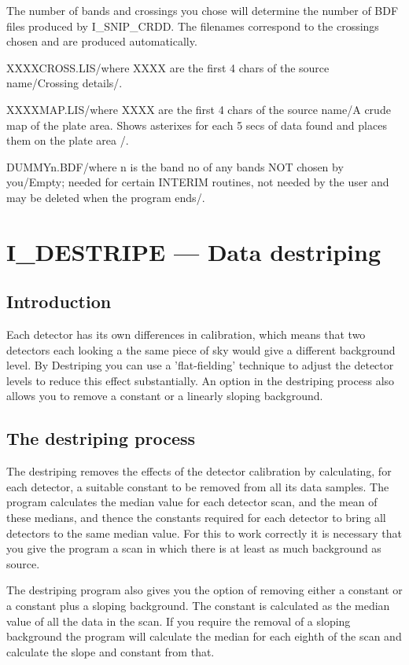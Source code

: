 The number of bands and crossings you chose will determine the number of BDF
files  produced by I\_SNIP\_CRDD. The filenames correspond to the crossings
chosen and are produced automatically.

\tfile XXXXCROSS.LIS/where XXXX are the first 4 chars of the
source name/Crossing details/.

\tfile XXXXMAP.LIS/where XXXX are the first 4 chars of the source name/A crude
map of the plate area.\hfill\break
Shows asterixes for each 5 secs of data found and places them on the plate
area\hfill\break
/.

\tfile DUMMYn.BDF/where n is the band no of any bands NOT chosen by you/Empty;
needed for certain INTERIM routines, not needed by the user and may be
deleted when the program ends/.


\pagebreak
\section {I\_DESTRIPE --- Data destriping}

\subsection {Introduction}

Each detector has its own differences in calibration, which means that two
detectors each looking a the same piece of sky would give a different background
level. By Destriping you can use a 'flat-fielding' technique  to adjust the
detector levels to reduce this effect substantially. An option in the
destriping process also allows you to remove a constant or a linearly sloping
background.

\subsection {The destriping process}

The destriping removes the effects of the detector calibration by calculating,
for each detector, a suitable constant to be removed from all its data samples.
The program calculates the median value for each detector scan, and the mean of
these medians, and thence the constants required for each detector to bring all
detectors to the same median value. For this to work correctly it is necessary
that you give the program a scan in which there is at least as much background
as source.

The destriping program also gives you the option of removing either a constant
or a constant plus a sloping background. The constant is calculated as the
median value of all the data in the scan. If you require the removal of a
sloping background the program will calculate the median for each eighth of the
scan and calculate the slope and constant from that.

